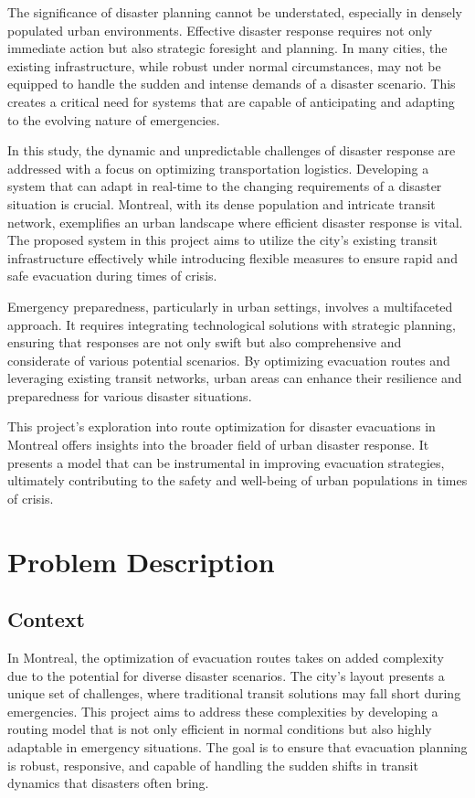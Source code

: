 \documentclass[12pt]{article}
\begin{document}
The significance of disaster planning cannot be understated, especially in densely populated urban environments. Effective disaster response requires not only immediate action but also strategic foresight and planning. In many cities, the existing infrastructure, while robust under normal circumstances, may not be equipped to handle the sudden and intense demands of a disaster scenario. This creates a critical need for systems that are capable of anticipating and adapting to the evolving nature of emergencies.

In this study, the dynamic and unpredictable challenges of disaster response are addressed with a focus on optimizing transportation logistics. Developing a system that can adapt in real-time to the changing requirements of a disaster situation is crucial. Montreal, with its dense population and intricate transit network, exemplifies an urban landscape where efficient disaster response is vital. The proposed system in this project aims to utilize the city's existing transit infrastructure effectively while introducing flexible measures to ensure rapid and safe evacuation during times of crisis.

Emergency preparedness, particularly in urban settings, involves a multifaceted approach. It requires integrating technological solutions with strategic planning, ensuring that responses are not only swift but also comprehensive and considerate of various potential scenarios. By optimizing evacuation routes and leveraging existing transit networks, urban areas can enhance their resilience and preparedness for various disaster situations.

This project's exploration into route optimization for disaster evacuations in Montreal offers insights into the broader field of urban disaster response. It presents a model that can be instrumental in improving evacuation strategies, ultimately contributing to the safety and well-being of urban populations in times of crisis.

\section{Problem Description}

\subsection{Context}

In Montreal, the optimization of evacuation routes takes on added complexity due to the potential for diverse disaster scenarios. The city's layout presents a unique set of challenges, where traditional transit solutions may fall short during emergencies. This project aims to address these complexities by developing a routing model that is not only efficient in normal conditions but also highly adaptable in emergency situations. The goal is to ensure that evacuation planning is robust, responsive, and capable of handling the sudden shifts in transit dynamics that disasters often bring.
\end{document}
